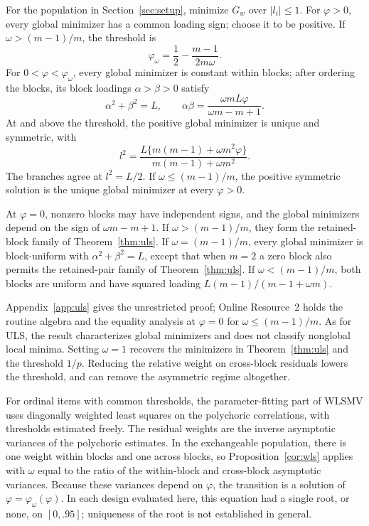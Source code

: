 \begin{proposition}
\label{cor:wls}
For the population in Section~\ref{sec:setup}, minimize $G_w$ over $|l_i|\le1$. For $\varphi>0$, every global minimizer has a common loading sign; choose it to be positive. If $\omega>(m-1)/m$, the threshold is
\begin{equation}
\varphi_\omega=\frac12-\frac{m-1}{2m\omega}.
\label{eq:wls-threshold}
\end{equation}
For $0<\varphi<\varphi_\omega$, every global minimizer is constant within blocks; after ordering the blocks, its block loadings $\alpha>\beta>0$ satisfy
\[
\alpha^2+\beta^2=L,\qquad
\alpha\beta=\frac{\omega mL\varphi}{\omega m-m+1}.
\]
At and above the threshold, the positive global minimizer is unique and symmetric, with
\[
l^2=\frac{L\{m(m-1)+\omega m^2\varphi\}}{m(m-1)+\omega m^2}.
\]
The branches agree at $l^2=L/2$. If $\omega\le(m-1)/m$, the positive symmetric solution is the unique global minimizer at every $\varphi>0$.

At $\varphi=0$, nonzero blocks may have independent signs, and the global minimizers depend on the sign of $\omega m-m+1$. If $\omega>(m-1)/m$, they form the retained-block family of Theorem~\ref{thm:uls}. If $\omega=(m-1)/m$, every global minimizer is block-uniform with $\alpha^2+\beta^2=L$, except that when $m=2$ a zero block also permits the retained-pair family of Theorem~\ref{thm:uls}. If $\omega<(m-1)/m$, both blocks are uniform and have squared loading $L(m-1)/(m-1+\omega m)$.

\end{proposition}

Appendix~\ref{app:uls} gives the unrestricted proof; Online Resource~2 holds the routine algebra and the equality analysis at $\varphi=0$ for $\omega\le(m-1)/m$. As for ULS, the result characterizes global minimizers and does not classify nonglobal local minima. Setting $\omega=1$ recovers the minimizers in Theorem~\ref{thm:uls} and the threshold $1/p$. Reducing the relative weight on cross-block residuals lowers the threshold, and can remove the asymmetric regime altogether.

For ordinal items with common thresholds, the parameter-fitting part of WLSMV uses diagonally weighted least squares on the polychoric correlations, with thresholds estimated freely. The residual weights are the inverse asymptotic variances of the polychoric estimates. In the exchangeable population, there is one weight within blocks and one across blocks, so Proposition~\ref{cor:wls} applies with $\omega$ equal to the ratio of the within-block and cross-block asymptotic variances. Because these variances depend on $\varphi$, the transition is a solution of $\varphi=\varphi_\omega(\varphi)$. In each design evaluated here, this equation had a single root, or none, on $[0,.95]$; uniqueness of the root is not established in general.

